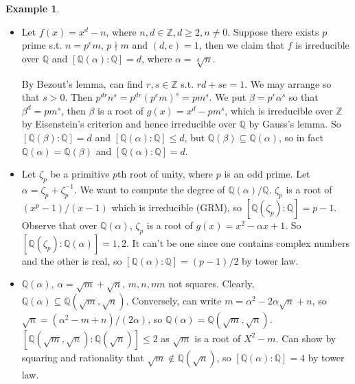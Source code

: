 \documentclass{article}
\theoremstyle{definition}
\newtheorem{example}[defn]{Example}
\theoremstyle{remark}
\theoremstyle{plain}
\newcommand{\ZZ}{\mathbb{Z}}
\newcommand{\QQ}{\mathbb{Q}}
\begin{document}
\begin{example}
    \begin{itemize}
        \item Let $f(x)=x^d-n$, where $n,d\in\ZZ, d\ge 2, n\neq 0$. Suppose there exists $p$ prime s.t. $n=p^em$, $p\nmid m$ and $(d,e)=1$, then we claim that $f$ is irreducible over $\QQ$ and $[\QQ(\alpha):\QQ]=d$, where $\alpha=\sqrt[d]{n}$.

        By Bezout's lemma, can find $r,s\in\ZZ$ s.t. $rd+se=1$. We may arrange so that $s>0$. Then $p^{dr}n^s=p^{dr}(p^em)^s=pm^s$. We put $\beta=p^r\alpha^s$ so that $\beta^d=pm^s$, then $\beta$ is a root of $g(x)=x^d-pm^s$, which is irreducible over $\ZZ$ by Eisenstein's criterion and hence irreducible over $\QQ$ by Gauss's lemma. So $[\QQ(\beta):\QQ]=d$ and $[\QQ(\alpha):\QQ]\le d$, but $\QQ(\beta)\subseteq\QQ(\alpha)$, so in fact $\QQ(\alpha)=\QQ(\beta)$ and $[\QQ(\alpha):\QQ]=d$.
        \item Let $\zeta_p$ be a primitive $p$th root of unity, where $p$ is an odd prime. Let $\alpha=\zeta_p+\zeta_p^{-1}$. We want to compute the degree of $\QQ(\alpha)/\QQ$. $\zeta_p$ is a root of $(x^p-1)/(x-1)$ which is irreducible (GRM), so $[\QQ(\zeta_p):\QQ]=p-1$. Observe that over $\QQ(\alpha)$, $\zeta_p$ is a root of $g(x)=x^2-\alpha x+1$. So $[\QQ(\zeta_p):\QQ(\alpha)]=1,2$. It can't be one since one contains complex numbers and the other is real, so $[\QQ(\alpha):\QQ]=(p-1)/2$ by tower law.
        \item $\QQ(\alpha)$, $\alpha=\sqrt{m}+\sqrt{n}$, $m,n,mn$ not squares. Clearly, $\QQ(\alpha)\subseteq\QQ(\sqrt{m},\sqrt{n})$. Conversely, can write $m=\alpha^2-2\alpha\sqrt{n}+n$, so $\sqrt{n}=(\alpha^2-m+n)/(2\alpha)$, so $\QQ(\alpha)=\QQ(\sqrt{m},\sqrt{n})$. $[\QQ(\sqrt{m},\sqrt{n}):\QQ(\sqrt{n})]\le 2$ as $\sqrt{m}$ is a root of $X^2-m$. Can show by squaring and rationality that $\sqrt{m}\not\in\QQ(\sqrt{n})$, so $[\QQ(\alpha):\QQ]=4$ by tower law.
    \end{itemize}
\end{example}
\end{document}
